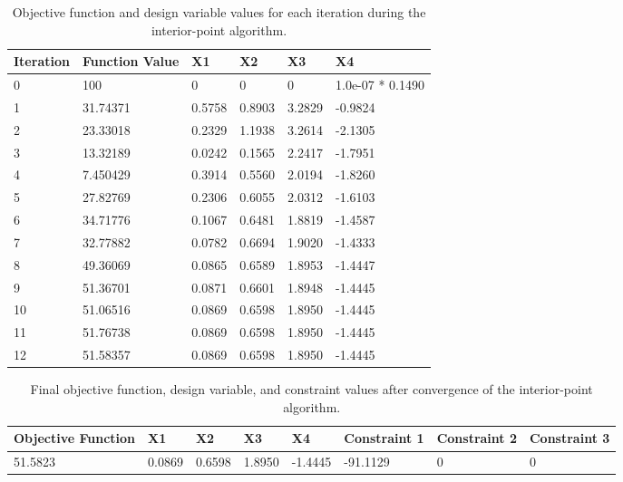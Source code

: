 \documentclass[11pt]{article}
\begin{document}
\begin{table}[htbp]
	\centering
    \begin{tabular}{|l|l|l|l|l|l|}
        \hline
        Iteration & Function Value & X1 & X2 & X3 & X4\\ \hline
0 & 100 & 0   &      0    &     0  &  1.0e-07 * 0.1490\\ 
1 & 31.74371 & 0.5758   & 0.8903  &  3.2829  & -0.9824\\ 
2 & 23.33018 & 0.2329   & 1.1938  &  3.2614  & -2.1305\\ 
3 & 13.32189 & 0.0242    &0.1565  &  2.2417  & -1.7951\\ 
4 & 7.450429 & 0.3914  &  0.5560  &  2.0194  & -1.8260\\ 
5 & 27.82769 & 0.2306  &  0.6055  &  2.0312  & -1.6103 \\ 
6 & 34.71776 & 0.1067  &  0.6481  &  1.8819  & -1.4587\\ 
7 & 32.77882 & 0.0782  &  0.6694  &  1.9020  & -1.4333 \\ 
8 & 49.36069 & 0.0865  &  0.6589  &  1.8953  & -1.4447 \\
9 & 51.36701 & 0.0871  &  0.6601  &  1.8948  & -1.4445 \\ 
10 & 51.06516 & 0.0869  &  0.6598  &  1.8950  & -1.4445 \\ 
11 & 51.76738 & 0.0869  &  0.6598  &  1.8950  & -1.4445 \\ 
12 & 51.58357 &  0.0869  &  0.6598  &  1.8950 &  -1.4445\\
        \hline
    \end{tabular}
	\caption{Objective function and design variable values for each iteration during the interior-point algorithm.}
	\label{Table1}
\end{table}

\begin{table}[htbp]
	\centering
    \begin{tabular}{|l|l|l|l|l|l|l|l|}
        \hline
	Objective Function & X1 & X2 & X3 & X4 & Constraint 1 & Constraint 2 & Constraint 3 \\ \hline
	51.5823 & 0.0869 & 0.6598 & 1.8950 & -1.4445 & -91.1129 & 0 & 0 \\ 
	\hline
    \end{tabular}
	\caption{Final objective function, design variable, and constraint values after convergence of the interior-point algorithm.}
	\label{Table2}
\end{table}
\end{document}
